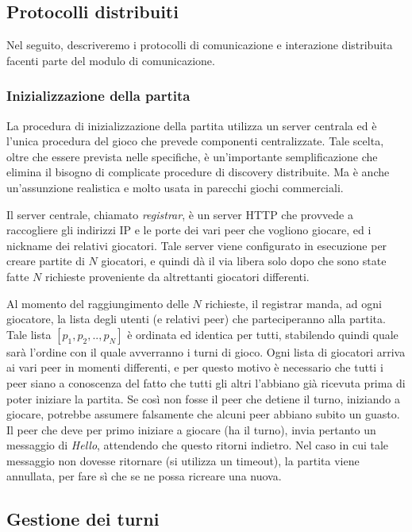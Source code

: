 \documentclass[10.5pt]{article}
\begin{document}
\subsection{Protocolli distribuiti}
Nel seguito, descriveremo i protocolli di comunicazione e interazione distribuita facenti parte del modulo di comunicazione.

\subsubsection{Inizializzazione della partita}

La procedura di inizializzazione della partita utilizza un server centrala ed è l'unica procedura del gioco che prevede componenti centralizzate. Tale scelta, oltre che essere prevista nelle specifiche, è un'importante semplificazione che elimina il bisogno di complicate procedure di discovery distribuite. Ma è anche un'assunzione realistica e molto usata in parecchi giochi commerciali.

Il server centrale, chiamato \textit{registrar}, è un server HTTP che provvede a raccogliere gli indirizzi IP e le porte dei vari peer che vogliono giocare, ed i nickname dei relativi giocatori. Tale server viene configurato in esecuzione per creare partite di $N$ giocatori, e quindi dà il via libera solo dopo che sono state fatte $N$ richieste proveniente da altrettanti giocatori differenti.

Al momento del raggiungimento delle $N$ richieste, il registrar manda, ad ogni giocatore, la lista degli utenti (e relativi peer) che parteciperanno alla partita. Tale lista $[p_1, p_2, .., p_N]$ è ordinata ed identica per tutti, stabilendo quindi quale sarà l'ordine con il quale avverranno i turni di gioco. Ogni lista di giocatori arriva ai vari peer in momenti differenti, e per questo motivo è necessario che tutti i peer siano a conoscenza del fatto che tutti gli altri l'abbiano già ricevuta prima di poter iniziare la partita. Se così non fosse il peer che detiene il turno, iniziando a giocare, potrebbe assumere falsamente che alcuni peer abbiano subito un guasto. Il peer che deve per primo iniziare a giocare (ha il turno), invia pertanto un messaggio di \textit{Hello}, attendendo che questo ritorni indietro. Nel caso in cui tale messaggio non dovesse ritornare (si utilizza un timeout), la partita viene annullata, per fare sì che se ne possa ricreare una nuova. 


\subsection{Gestione dei turni}
\end{document}
